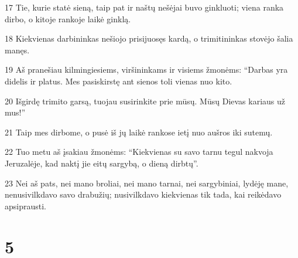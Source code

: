 \par 17 Tie, kurie statė sieną, taip pat ir naštų nešėjai buvo ginkluoti; viena ranka dirbo, o kitoje rankoje laikė ginklą. 
\par 18 Kiekvienas darbininkas nešiojo prisijuosęs kardą, o trimitininkas stovėjo šalia manęs. 
\par 19 Aš pranešiau kilmingiesiems, viršininkams ir visiems žmonėms: “Darbas yra didelis ir platus. Mes pasiskirstę ant sienos toli vienas nuo kito. 
\par 20 Išgirdę trimito garsą, tuojau susirinkite prie mūsų. Mūsų Dievas kariaus už mus!” 
\par 21 Taip mes dirbome, o pusė iš jų laikė rankose ietį nuo aušros iki sutemų. 
\par 22 Tuo metu aš įsakiau žmonėms: “Kiekvienas su savo tarnu tegul nakvoja Jeruzalėje, kad naktį jie eitų sargybą, o dieną dirbtų”. 
\par 23 Nei aš pats, nei mano broliai, nei mano tarnai, nei sargybiniai, lydėję mane, nenusivilkdavo savo drabužių; nusivilkdavo kiekvienas tik tada, kai reikėdavo apsiprausti.



\chapter{5}

